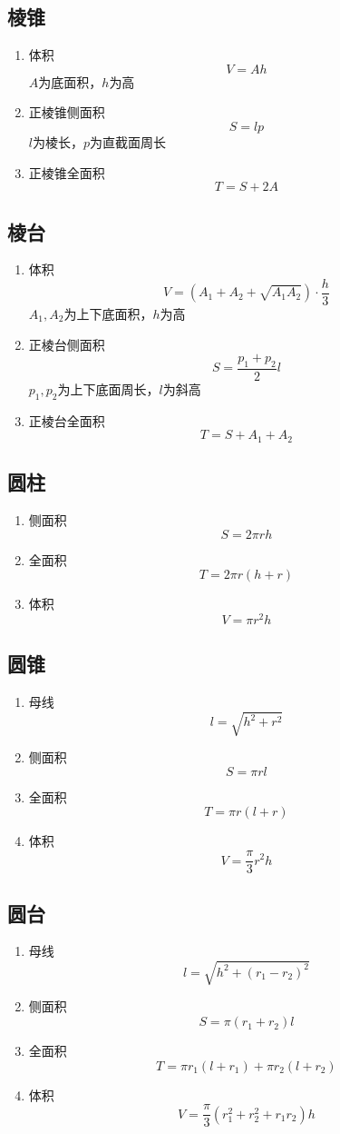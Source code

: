 	\subsection{棱锥}
		\begin{enumerate}
			\item 体积
				$$V=Ah$$
				$A$为底面积，$h$为高
			\item 正棱锥侧面积
				$$S=lp$$
				$l$为棱长，$p$为直截面周长
			\item 正棱锥全面积
				$$T=S+2A$$
		\end{enumerate}
	\subsection{棱台}
		\begin{enumerate}
			\item 体积
				$$V=(A_1+A_2+\sqrt{A_1A_2}) \cdot \frac{h}{3}$$
				$A_1,A_2$为上下底面积，$h$为高
			\item 正棱台侧面积
				$$S=\frac{p_1+p_2}{2}l$$
				$p_1,p_2$为上下底面周长，$l$为斜高
			\item 正棱台全面积
				$$T=S+A_1+A_2$$
		\end{enumerate}
	\subsection{圆柱}
		\begin{enumerate}
			\item 侧面积
				$$S=2\pi rh$$
			\item 全面积
				$$T=2\pi r(h+r)$$
			\item 体积
				$$V=\pi r^2h$$
		\end{enumerate}
	\subsection{圆锥}
		\begin{enumerate}
			\item 母线
				$$l=\sqrt{h^2+r^2}$$
			\item 侧面积
				$$S=\pi rl$$
			\item 全面积
				$$T=\pi r(l+r)$$
			\item 体积
				$$V=\frac{\pi}{3} r^2h$$
		\end{enumerate}
	\subsection{圆台}
		\begin{enumerate}
			\item 母线
				$$l=\sqrt{h^2+(r_1-r_2)^2}$$
			\item 侧面积
				$$S=\pi(r_1+r_2)l$$
			\item 全面积
				$$T=\pi r_1(l+r_1)+\pi r_2(l+r_2)$$
			\item 体积
				$$V=\frac{\pi}{3}(r_1^2+r_2^2+r_1r_2)h$$
		\end{enumerate}
